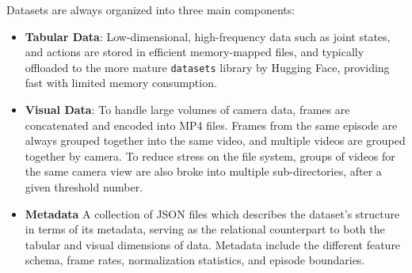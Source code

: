 Datasets are always organized into three main components:
\begin{itemize}
\item \textbf{Tabular Data}: Low-dimensional, high-frequency data such as joint states, and actions are stored in efficient memory-mapped files, and typically offloaded to the more mature \texttt{datasets} library by Hugging Face, providing fast with limited memory consumption.
\item \textbf{Visual Data}: To handle large volumes of camera data, frames are concatenated and encoded into MP4 files. Frames from the same episode are always grouped together into the same video, and multiple videos are grouped together by camera. To reduce stress on the file system, groups of videos for the same camera view are also broke into multiple sub-directories, after a given threshold number.
\item \textbf{Metadata} A collection of JSON files which describes the dataset's structure in terms of its metadata, serving as the relational counterpart to both the tabular and visual dimensions of data. Metadata include the different feature schema, frame rates, normalization statistics, and episode boundaries.
\end{itemize}

